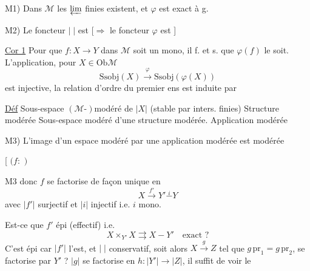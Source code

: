 M1) \deleted{$\unsure{\varphi}$} Dans $\mathcal M$ les $\varprojlim$ finies existent, et $\varphi$ est exact à g.

M2) Le foncteur $|\;|$ \deleted{$\unsure{\varphi}$} est 
[$\Longrightarrow$ le foncteur $\varphi$ est ]

\uline{Cor 1} Pour que $f:X\to Y$ dans $\mathcal M$ soit un mono, il f. et s. que $\varphi(f)$ le soit. L'application, pour $X\in\mathrm{Ob}\mathcal M$
\[
\mathrm{Ssobj}(X)\xrightarrow{\varphi}\mathrm{Ssobj}(\varphi(X))
\]
est injective, la relation d'ordre du premier ens est induite par 

\uline{Déf} Sous-espace $(\mathcal M\text{-})$modéré de $|X|$ (stable par inters. finies)
Structure modérée  Sous-espace modéré d'une structure modérée. Application modérée


M3) L'image d'un espace modéré par une application modérée est modérée

[
$(f:$
$)$

M3 donc $f$ se factorise de façon  unique en
\[
X\xrightarrow{f'}Y'\overset{i}{-}Y
\]
avec $|f'|$ surjectif et $|i|$ injectif i.e. $i$ mono.

Est-ce que $f'$ épi (effectif) i.e.
\[
X\times_{Y'}X\rightrightarrows X-Y'\quad\text{exact ?}
\]
C'est épi car $|f'|$ l'est, et $|\;|$ conservatif,
soit alors $X\xrightarrow{g}Z$ tel que $g\,\mathrm{pr}_1=g\,\mathrm{pr}_2$, se factorise par $Y'$ ?
 $|g|$ se factorise en $h:|Y'|\to|Z|$, il suffit de voir le

